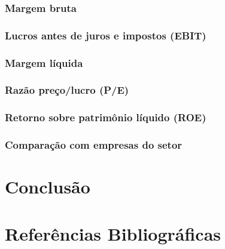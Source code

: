 \documentclass[grad,numbers]{coppe}
\begin{document}
  \hypertarget{margem-bruta}{%
  \subsection{Margem bruta}\label{margem-bruta}}

  \hypertarget{lucros-antes-de-juros-e-impostos-ebit}{%
  \subsection{Lucros antes de juros e impostos (EBIT)}\label{lucros-antes-de-juros-e-impostos-ebit}}

  \hypertarget{margem-luxedquida}{%
  \subsection{Margem líquida}\label{margem-luxedquida}}

  \hypertarget{razuxe3o-preuxe7olucro-pe}{%
  \subsection{Razão preço/lucro (P/E)}\label{razuxe3o-preuxe7olucro-pe}}

  \hypertarget{retorno-sobre-patrimuxf4nio-luxedquido-roe}{%
  \subsection{Retorno sobre patrimônio líquido (ROE)}\label{retorno-sobre-patrimuxf4nio-luxedquido-roe}}

  \hypertarget{comparauxe7uxe3o-com-empresas-do-setor}{%
  \subsection{Comparação com empresas do setor}\label{comparauxe7uxe3o-com-empresas-do-setor}}

  \hypertarget{conclusuxe3o}{%
  \chapter{Conclusão}\label{conclusuxe3o}}

  \backmatter

  \hypertarget{referuxeancias-bibliogruxe1ficas}{%
  \chapter*{Referências Bibliográficas}\label{referuxeancias-bibliogruxe1ficas}}
\end{document}

